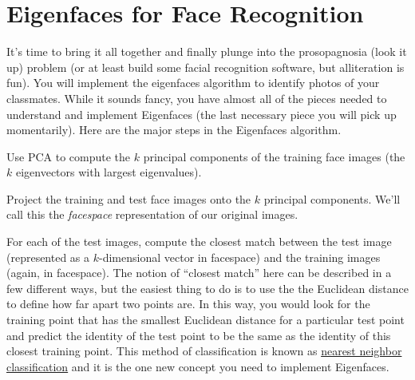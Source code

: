 \section{Eigenfaces for Face Recognition}

It's time to bring it all together and finally plunge into the prosopagnosia (look it up) problem (or at least build some facial recognition software, but alliteration is fun). You will implement the eigenfaces algorithm to identify photos of your classmates.  While it sounds fancy, you have almost all of the pieces needed to understand and implement Eigenfaces (the last necessary piece you will pick up momentarily).  Here are the major steps in the Eigenfaces algorithm.

\be
\item Use PCA to compute the $k$ principal components of the training face images (the $k$ eigenvectors with largest eigenvalues).
\item Project the training and test face images onto the $k$ principal components.  We'll call this the \emph{facespace} representation of our original images.
\item For each of the test images, compute the closest match between the test image (represented as a $k$-dimensional vector in facespace) and the training images (again, in facespace).  The notion of ``closest match'' here can be described in a few different ways, but the easiest thing to do is to use the the Euclidean distance to define how far apart two points are.  In this way, you would look for the training point that has the smallest Euclidean distance for a particular test point and predict the identity of the test point to be the same as the identity of this closest training point.  This method of classification is known as \href{https://en.wikipedia.org/wiki/K-nearest_neighbors_algorithm}{nearest neighbor classification} and it is the one new concept you need to implement Eigenfaces.
\ee


